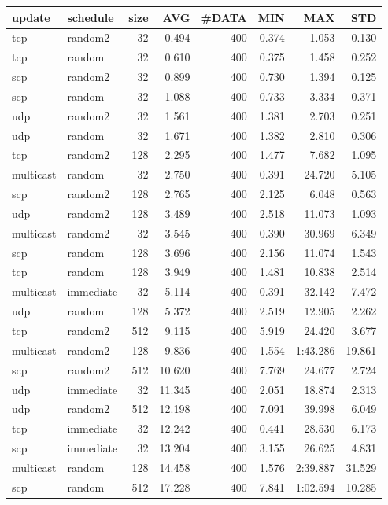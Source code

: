 \begin{tabular}{|llrrrrrr|}
\hline
{\sc update}&{\sc schedule}&{\sc size}&{\sc AVG}&{\sc\#DATA}&{\sc MIN}&{\sc MAX}&{\sc STD}\\
\hline
tcp & random2 & 32 &  0.494 & 400 & 0.374 & 1.053 & 0.130\\
tcp & random & 32 &  0.610 & 400 & 0.375 & 1.458 & 0.252\\
scp & random2 & 32 &  0.899 & 400 & 0.730 & 1.394 & 0.125\\
scp & random & 32 &  1.088 & 400 & 0.733 & 3.334 & 0.371\\
udp & random2 & 32 &  1.561 & 400 & 1.381 & 2.703 & 0.251\\
udp & random & 32 &  1.671 & 400 & 1.382 & 2.810 & 0.306\\
tcp & random2 & 128 &  2.295 & 400 & 1.477 & 7.682 & 1.095\\
multicast & random & 32 &  2.750 & 400 & 0.391 & 24.720 & 5.105\\
scp & random2 & 128 &  2.765 & 400 & 2.125 & 6.048 & 0.563\\
udp & random2 & 128 &  3.489 & 400 & 2.518 & 11.073 & 1.093\\
multicast & random2 & 32 &  3.545 & 400 & 0.390 & 30.969 & 6.349\\
scp & random & 128 &  3.696 & 400 & 2.156 & 11.074 & 1.543\\
tcp & random & 128 &  3.949 & 400 & 1.481 & 10.838 & 2.514\\
multicast & immediate & 32 &  5.114 & 400 & 0.391 & 32.142 & 7.472\\
udp & random & 128 &  5.372 & 400 & 2.519 & 12.905 & 2.262\\
tcp & random2 & 512 &  9.115 & 400 & 5.919 & 24.420 & 3.677\\
multicast & random2 & 128 &  9.836 & 400 & 1.554 & 1:43.286 & 19.861\\
scp & random2 & 512 &  10.620 & 400 & 7.769 & 24.677 & 2.724\\
udp & immediate & 32 &  11.345 & 400 & 2.051 & 18.874 & 2.313\\
udp & random2 & 512 &  12.198 & 400 & 7.091 & 39.998 & 6.049\\
tcp & immediate & 32 &  12.242 & 400 & 0.441 & 28.530 & 6.173\\
scp & immediate & 32 &  13.204 & 400 & 3.155 & 26.625 & 4.831\\
multicast & random & 128 &  14.458 & 400 & 1.576 & 2:39.887 & 31.529\\
scp & random & 512 &  17.228 & 400 & 7.841 & 1:02.594 & 10.285\\

\end{tabular}
